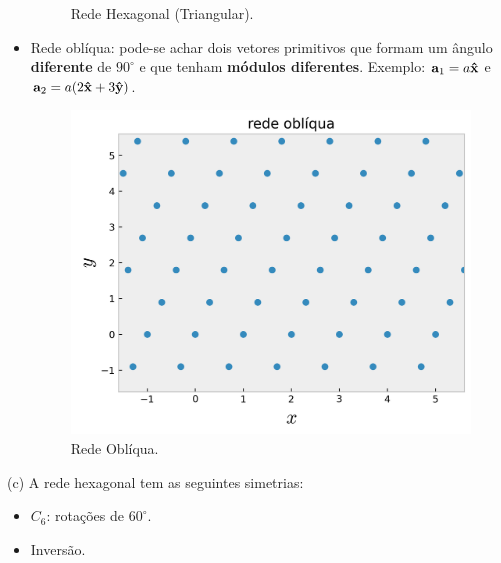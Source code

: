 \documentclass[a4paper,10pt]{article}
\begin{document}
\begin{itemize}
\begin{figure}[H]
\caption{Rede Hexagonal (Triangular).}
\label{fig:lat-triang}
\end{figure}
\item Rede oblíqua: pode-se achar dois vetores primitivos que formam um ângulo \textbf{diferente} de $90^\circ$ e que tenham \textbf{módulos diferentes}. Exemplo: $\vb{a}_1 = a \vu{x}$ e $\vb{a}_2 = a (2 \vu{x} + 3\vu{y})$.
\begin{figure}[H]
\centering
\includegraphics[width=0.35\linewidth]{fig/lattice_obliq.png}
\caption{Rede Oblíqua.}
\label{fig:lat-obliq}
\end{figure}
\end{itemize}

\n

(c) A rede hexagonal tem as seguintes simetrias:
\begin{itemize}
\item $C_6$: rotações de $60^\circ$.
\item Inversão.
\end{itemize}
\end{document}
